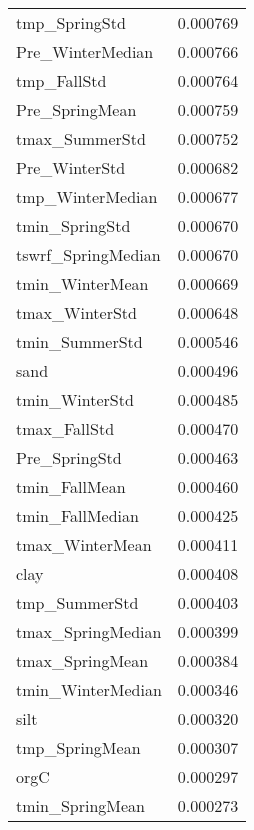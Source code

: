 \begin{tabular}{lr}
tmp_SpringStd & 0.000769 \\
Pre_WinterMedian & 0.000766 \\
tmp_FallStd & 0.000764 \\
Pre_SpringMean & 0.000759 \\
tmax_SummerStd & 0.000752 \\
Pre_WinterStd & 0.000682 \\
tmp_WinterMedian & 0.000677 \\
tmin_SpringStd & 0.000670 \\
tswrf_SpringMedian & 0.000670 \\
tmin_WinterMean & 0.000669 \\
tmax_WinterStd & 0.000648 \\
tmin_SummerStd & 0.000546 \\
sand & 0.000496 \\
tmin_WinterStd & 0.000485 \\
tmax_FallStd & 0.000470 \\
Pre_SpringStd & 0.000463 \\
tmin_FallMean & 0.000460 \\
tmin_FallMedian & 0.000425 \\
tmax_WinterMean & 0.000411 \\
clay & 0.000408 \\
tmp_SummerStd & 0.000403 \\
tmax_SpringMedian & 0.000399 \\
tmax_SpringMean & 0.000384 \\
tmin_WinterMedian & 0.000346 \\
silt & 0.000320 \\
tmp_SpringMean & 0.000307 \\
orgC & 0.000297 \\
tmin_SpringMean & 0.000273 \\
\bottomrule
\end{tabular}
